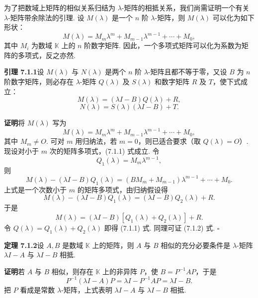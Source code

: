 \documentclass[UTF8,12pt,a4paper,fontset=fandol]{ctexart}
\begin{document}
为了把数域上矩阵的相似关系归结为 $\lambda$-矩阵的相抵关系，我们尚需证明一个有关 $\lambda$-矩阵带余除法的引理. 设 $M(\lambda)$ 是一个 $n$ 阶 $\lambda$-矩阵，则 $M(\lambda)$ 可以化为如下形状：
\[
M(\lambda)=M_m\lambda^m+M_{m-1}\lambda^{m-1}+\cdots+M_0,
\]
其中 $M_i$ 为数域 $\mathbb{K}$ 上的 $n$ 阶数字矩阵. 因此，一个多项式矩阵可以化为系数为矩阵的多项式，反之亦然.

\noindent\textbf{引理 7.1.1}\quad 设 $M(\lambda)$ 与 $N(\lambda)$ 是两个 $n$ 阶 $\lambda$-矩阵且都不等于零，又设 $B$ 为 $n$ 阶数字矩阵，则必存在 $\lambda$-矩阵 $Q(\lambda)$ 及 $S(\lambda)$ 和数字矩阵 $R$ 及 $T$，使下式成立：
\begin{equation}
M(\lambda)=(\lambda I-B)Q(\lambda)+R,
\tag{7.1.1}
\end{equation}
\begin{equation}
N(\lambda)=S(\lambda)(\lambda I-B)+T.
\tag{7.1.2}
\end{equation}

\noindent\textbf{证明}\quad 将 $M(\lambda)$ 写为
\[
M(\lambda)=M_m\lambda^m+M_{m-1}\lambda^{m-1}+\cdots+M_0,
\]
其中 $M_m\neq O$. 可对 $m$ 用归纳法，若 $m=0$，则已适合要求（取 $Q(\lambda)=O$）. 现设对小于 $m$ 次的矩阵多项式，(7.1.1) 式成立. 令
\[
Q_1(\lambda)=M_m\lambda^{m-1},
\]
则
\begin{equation}
M(\lambda)-(\lambda I-B)Q_1(\lambda)=(BM_m+M_{m-1})\lambda^{m-1}+\cdots+M_0.
\tag{7.1.3}
\end{equation}
上式是一个次数小于 $m$ 的矩阵多项式，由归纳假设得
\[
M(\lambda)-(\lambda I-B)Q_1(\lambda)=(\lambda I-B)Q_2(\lambda)+R.
\]
于是
\[
M(\lambda)=(\lambda I-B)\left[Q_1(\lambda)+Q_2(\lambda)\right]+R.
\]
令 $Q(\lambda)=Q_1(\lambda)+Q_2(\lambda)$ 即得 (7.1.1) 式. 同理可证 (7.1.2) 式. $\square$

\noindent\textbf{定理 7.1.2}\quad 设 $A,B$ 是数域 $\mathbb{K}$ 上的矩阵，则 $A$ 与 $B$ 相似的充分必要条件是 $\lambda$-矩阵 $\lambda I-A$ 与 $\lambda I-B$ 相抵.

\noindent\textbf{证明}\quad 若 $A$ 与 $B$ 相似，则存在 $\mathbb{K}$ 上的非异阵 $P$，使 $B=P^{-1}AP$，于是
\begin{equation}
P^{-1}(\lambda I-A)P=\lambda I-P^{-1}AP=\lambda I-B.
\tag{7.1.4}
\end{equation}
把 $P$ 看成是常数 $\lambda$-矩阵，上式表明 $\lambda I-A$ 与 $\lambda I-B$ 相抵.
\end{document}
